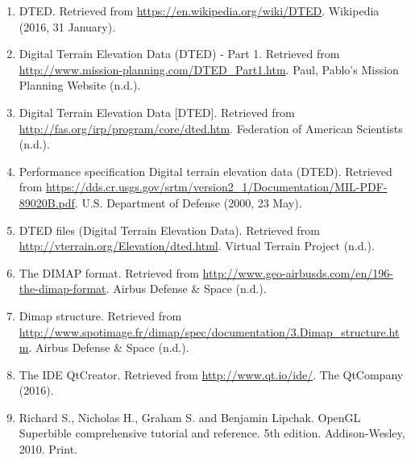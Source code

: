 \documentclass[11pt]{article}
\begin{document}
\begin{enumerate}[{(1)}]
\item DTED. Retrieved from \url{https://en.wikipedia.org/wiki/DTED}. Wikipedia (2016, 31 January).

\item Digital Terrain Elevation Data (DTED) - Part 1. Retrieved from \url{http://www.mission-planning.com/DTED_Part1.htm}. Paul, Pablo's Mission Planning Website (n.d.).

\item Digital Terrain Elevation Data [DTED]. Retrieved from \url{http://fas.org/irp/program/core/dted.htm}. Federation of American Scientists (n.d.).
 
\item Performance specification Digital terrain elevation data (DTED). Retrieved from \url{https://dds.cr.usgs.gov/srtm/version2_1/Documentation/MIL-PDF-89020B.pdf}. U.S. Department of Defense (2000, 23 May).

\item DTED files (Digital Terrain Elevation Data). Retrieved from \url{http://vterrain.org/Elevation/dted.html}. Virtual Terrain Project (n.d.).


\item The DIMAP format. Retrieved from \url{http://www.geo-airbusds.com/en/196-the-dimap-format}. Airbus Defense \& Space (n.d.).

\item Dimap structure. Retrieved from \url{http://www.spotimage.fr/dimap/spec/documentation/3.Dimap_structure.htm}. Airbus Defense \& Space (n.d.).

\item The IDE QtCreator. Retrieved from \url{http://www.qt.io/ide/}. The QtCompany (2016).

\item Richard S., Nicholas H., Graham S. and Benjamin Lipchak. OpenGL Superbible comprehensive tutorial and reference. 5th edition. Addison-Wesley, 2010. Print.
\end{enumerate}
\end{document}
